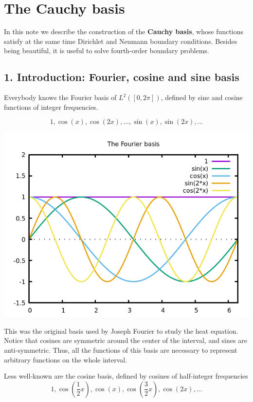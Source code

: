 \section{The Cauchy basis}

In this note we describe the construction of the {\bf Cauchy basis}, whose
functions satisfy at the same time Dirichlet and Neumann boundary conditions.
Besides being beautiful, it is useful to solve fourth-order boundary
problems.


\subsection{1. Introduction: Fourier, cosine and sine basis}

Everybody knows the Fourier basis of $L^2([0,2\pi])$, defined by sine and
cosine functions of integer frequencies.

$$
	1,\cos(x),\cos(2x),\ldots,\sin(x),\sin(2x),\ldots
$$

\includegraphics{sincos.png}


This was the original basis used by Joseph Fourier to study the heat equation.
Notice that cosines are symmetric around the center of the interval, and
sines are anti-symmetric.  Thus, all the functions of this basis are
necessary to represent arbitrary functions on the whole interval.

Less well-known are the cosine basis, defined by cosines of half-integer
frequencies
$$
1,\cos\left(\frac{1}{2}x\right),
\cos(x),
\cos\left(\frac{3}{2}x\right),
\cos(2x),\ldots
$$

